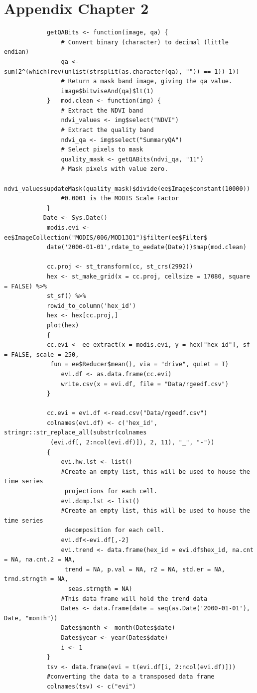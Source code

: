\documentclass[12pt,a4paper]{book}
\begin{document}
	\chapter{Appendix  Chapter 2}
		\begin{verbatim}
			getQABits <- function(image, qa) {
				# Convert binary (character) to decimal (little endian)
				qa <- sum(2^(which(rev(unlist(strsplit(as.character(qa), "")) == 1))-1))
				# Return a mask band image, giving the qa value.
				image$bitwiseAnd(qa)$lt(1)
			}	mod.clean <- function(img) {
				# Extract the NDVI band
				ndvi_values <- img$select("NDVI")
				# Extract the quality band
				ndvi_qa <- img$select("SummaryQA")
				# Select pixels to mask
				quality_mask <- getQABits(ndvi_qa, "11")
				# Mask pixels with value zero.
				ndvi_values$updateMask(quality_mask)$divide(ee$Image$constant(10000))
				#0.0001 is the MODIS Scale Factor
			}
		   Date <- Sys.Date()			
			modis.evi <- ee$ImageCollection("MODIS/006/MOD13Q1")$filter(ee$Filter$
			date('2000-01-01',rdate_to_eedate(Date)))$map(mod.clean)			
			
			cc.proj <- st_transform(cc, st_crs(2992))
			hex <- st_make_grid(x = cc.proj, cellsize = 17080, square = FALSE) %>%
			st_sf() %>%
			rowid_to_column('hex_id')
			hex <- hex[cc.proj,]
			plot(hex)			
			{
			cc.evi <- ee_extract(x = modis.evi, y = hex["hex_id"], sf = FALSE, scale = 250,
			 fun = ee$Reducer$mean(), via = "drive", quiet = T)
				evi.df <- as.data.frame(cc.evi)
				write.csv(x = evi.df, file = "Data/rgeedf.csv")
			}
			
			cc.evi = evi.df <-read.csv("Data/rgeedf.csv")
			colnames(evi.df) <- c('hex_id', stringr::str_replace_all(substr(colnames
			 (evi.df[, 2:ncol(evi.df)]), 2, 11), "_", "-"))				
			{
				evi.hw.lst <- list() 
				#Create an empty list, this will be used to house the time series
				 projections for each cell. 
				evi.dcmp.lst <- list() 
				#Create an empty list, this will be used to house the time series
				 decomposition for each cell.
				evi.df<-evi.df[,-2]
				evi.trend <- data.frame(hex_id = evi.df$hex_id, na.cnt = NA, na.cnt.2 = NA,
				 trend = NA, p.val = NA, r2 = NA, std.er = NA, trnd.strngth = NA,
				  seas.strngth = NA) 
				#This data frame will hold the trend data
				Dates <- data.frame(date = seq(as.Date('2000-01-01'), Date, "month"))
				Dates$month <- month(Dates$date)
				Dates$year <- year(Dates$date)
				i <- 1
			}
			tsv <- data.frame(evi = t(evi.df[i, 2:ncol(evi.df)])) 
			#converting the data to a transposed data frame
			colnames(tsv) <- c("evi")
			

\end{verbatim}
\end{document}
